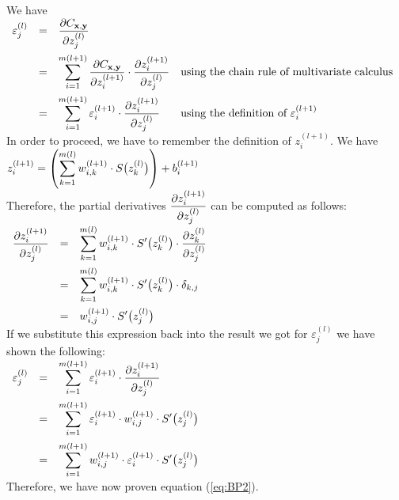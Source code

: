We have
\\[0.2cm]
\hspace*{1.3cm}
$
\begin{array}{lcll}
\varepsilon_j^{(l)} 
& = & \displaystyle \frac{\partial C_{\mathbf{x}, \mathbf{y}}}{\partial z_j^{(l)}} \\[0.5cm]
& = & \displaystyle \sum\limits_{i=1}^{m(l+1)} 
      \frac{\partial C_{\mathbf{x}, \mathbf{y}}}{\partial z_i^{(l+1)}} \cdot \frac{\partial z_i^{(l+1)}}{\partial z_j^{(l)}}
    & \mbox{using the chain rule of multivariate calculus}
      \\[0.5cm]
& = & \displaystyle \sum\limits_{i=1}^{m(l+1)} 
      \varepsilon_i^{(l+1)} \cdot \frac{\partial z_i^{(l+1)}}{\partial z_j^{(l)}}
      & \mbox{using the definition of $\varepsilon_i^{(l+1)}$}     
\end{array}
$
\\[0.2cm]
In order to proceed, we have to remember the definition of $z_i^{(l+1)}$.  We have
\\[0.2cm]
\hspace*{1.3cm}
$\displaystyle z_i^{(l+1)} = \left(\sum\limits_{k=1}^{m(l)} w_{i,k}^{(l+1)} \cdot S\bigl(z_k^{(l)}\bigr)\right) + b_i^{(l+1)}$
\\[0.2cm]
Therefore, the partial derivatives $\displaystyle\frac{\partial z_i^{(l+1)}}{\partial z_j^{(l)}}$ 
can be computed as follows:
\\[0.2cm]
\hspace*{1.3cm}
$
\begin{array}{lcl}
      \displaystyle \frac{\partial z_i^{(l+1)}}{\partial z_j^{(l)}} 
& = & \displaystyle \sum\limits_{k=1}^{m(l)} 
      w_{i,k}^{(l+1)} \cdot S'\bigl(z_k^{(l)}\bigr) \cdot \frac{\partial z_k^{(l)}}{\partial z_j^{(l)}} 
      \\[0.5cm]
& = & \displaystyle \sum\limits_{k=1}^{m(l)} 
      w_{i,k}^{(l+1)} \cdot S'\bigl(z_k^{(l)}\bigr) \cdot \delta_{k,j}
      \\[0.5cm]
& = & \displaystyle w_{i,j}^{(l+1)} \cdot S'\bigl(z_j^{(l)}\bigr) 
\end{array}
$
\\[0.2cm]
If we substitute this expression back into the result we got for $\varepsilon_j^{(l)}$ we have shown the following:
\\[0.2cm]
\hspace*{1.3cm}
$
\begin{array}{lcll}
\varepsilon_j^{(l)} 
& = & \displaystyle \sum\limits_{i=1}^{m(l+1)} 
      \varepsilon_i^{(l+1)} \cdot \frac{\partial z_i^{(l+1)}}{\partial z_j^{(l)}}
      \\[0.5cm]
& = & \displaystyle \sum\limits_{i=1}^{m(l+1)} 
      \varepsilon_i^{(l+1)} \cdot w_{i,j}^{(l+1)} \cdot S'\bigl(z_j^{(l)}\bigr) 
      \\[0.5cm]
& = & \displaystyle \sum\limits_{i=1}^{m(l+1)} 
      w_{i,j}^{(l+1)} \cdot \varepsilon_i^{(l+1)} \cdot S'\bigl(z_j^{(l)}\bigr) 
\end{array}
$
\\[0.2cm]
Therefore, we have now proven equation (\ref{eq:BP2}).  

